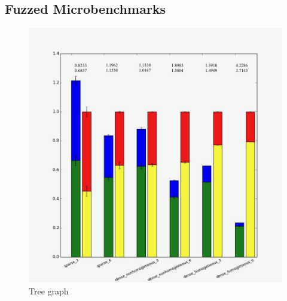 \subsection{Fuzzed Microbenchmarks}

\begin{figure}
    \includegraphics[width=0.9\columnwidth]{figures/graphs/TreeGraphwithNumbers.png}
    \caption{Tree graph}
\end{figure}